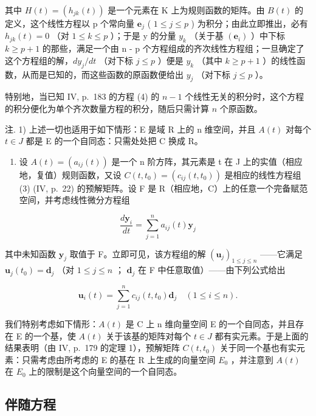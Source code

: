 其中 \(H(t) = \left(h_{jk}(t)\right)\) 是一个元素在 K 上为规则函数的矩阵。由 \(B(t)\) 的定义，这个线性方程以 p 个常向量 \(\mathbf{e}_{j}\) ( \(1 \leqslant j \leqslant p\) ) 为积分；由此立即推出，必有 \(h_{jk}(t) = 0\) （对 \(1 \leqslant k \leqslant p\) ）；于是 y 的分量 \(y_{k}\) （关于基 \((\mathbf{e}_{i})\) ）中下标 \(k \geqslant p + 1\) 的那些，满足一个由 n - p 个方程组成的齐次线性方程组；一旦确定了这个方程组的解，\(dy_{j}/dt\) （对下标 \(j \leqslant p\) ）便是 \(y_{k}\) （其中 \(k \geqslant p + 1\) ）的线性函数，从而是已知的，而这些函数的原函数便给出 \(y_{j}\) （对下标 \(j \leqslant p\) ）。

特别地，当已知 IV, p.~183 的方程 (4) 的 \(n - 1\) 个线性无关的积分时，这个方程的积分便化为单个齐次数量方程的积分，随后只需计算 \(n\) 个原函数。

注. 1) 上述一切也适用于如下情形：E 是域 R 上的 n 维空间，并且 \(A(t)\) 对每个 \(t \in J\) 都是 E 的一个自同态：只需处处把 C 换成 R。

\begin{enumerate}
\def\labelenumi{\arabic{enumi})}
\setcounter{enumi}{1}
\tightlist
\item
  设 \(A(t) = (a_{ij}(t))\) 是一个 n 阶方阵，其元素是 t 在 J 上的实值（相应地，复值）规则函数，又设 \(C(t, t_0) = (c_{ij}(t, t_0))\) 是相应的线性方程组 (3) (IV, p.~22) 的预解矩阵。设 F 是 R（相应地，C）上的任意一个完备赋范空间，并考虑线性微分方程组
\end{enumerate}

\[
\frac {d \mathbf {y} _ {i}}{d t} = \sum_ {j = 1} ^ {n} a _ {i j} (t) \mathbf {y} _ {j}
\]

其中未知函数 \(\mathbf{y}_j\) 取值于 F。立即可见，该方程组的解 \((\mathbf{u}_j)_{1\leqslant j\leqslant n}\) ——它满足 \(\mathbf{u}_j(t_0) = \mathbf{d}_j\) （对 \(1\leqslant j\leqslant n\) ； \(\mathbf{d}_j\) 在 F 中任意取值）——由下列公式给出

\[
\mathbf {u} _ {i} (t) = \sum_ {j = 1} ^ {n} c _ {i j} (t, t _ {0}) \mathbf {d} _ {j} \quad (1 \leqslant i \leqslant n).
\]

我们特别考虑如下情形：\(A(t)\) 是 C 上 n 维向量空间 E 的一个自同态，并且存在 E 的一个基，使 \(A(t)\) 关于该基的矩阵对每个 \(t \in J\) 都有实元素。于是上面的结果表明（由 IV, p.~179 的定理 1），预解矩阵 \(C(t, t_{0})\) 关于同一个基也有实元素：只需考虑由所考虑的 E 的基在 R 上生成的向量空间 \(E_{0}\) ，并注意到 \(A(t)\) 在 \(E_{0}\) 上的限制是这个向量空间的一个自同态。

\subsection{伴随方程}

